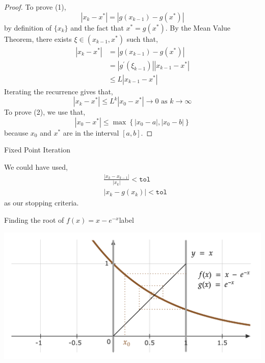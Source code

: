 \begin{proof}
    To prove (1),
    \[\left|x_k-x^*\right|=\left|g\left(x_{k-1}\right)-g\left(x^*\right)\right|\]
    by definition of $\{x_k\}$ and the fact that $x^* = g(x^*)$. By the Mean Value Theorem, there exists $\xi \in (x_{k-1}, x^*)$ such that,
    \begin{align*}
\left|x_k-x^*\right| &=\left|g\left(x_{k-1}\right)-g\left(x^*\right)\right| \\
&=\left|g^{\prime}\left(\xi_{k-1}\right)\right|\left|x_{k-1}-x^*\right| \\
&\leq L|x_{k-1} - x^*|
\end{align*}
Iterating the recurrence gives that,
\[|x_k - x^*| \leq L^k\left|x_0-x^*\right| \rightarrow 0 \text { as } k \rightarrow \infty\]
To prove (2), we use that,
\[|x_0 - x^*| \leq \max \left\{\left|x_0-a\right|,\left|x_0-b\right|\right\}\]
because $x_0$ and $x^*$ are in the interval $[a,b]$.
\end{proof}

\begin{algorithm}
	  \caption{Fixed Point Iteration}\label{fpi}
\end{algorithm}

\begin{marginfigure}
We could have used,
\begin{align*}
&\frac{\left|x_k-x_{k-1}\right|}{\left|x_k\right|}< \texttt{tol} \\
&\left|x_k-g\left(x_k\right)\right|<\texttt{tol}
\end{align*}
as our stopping criteria.
\end{marginfigure}

\begin{ex}{Finding the root of $f(x) = x - e^{-x}$}{label}
    \begin{center}
       \includegraphics[width=\textwidth]{figures/fig-8.png}
\end{center}
\end{ex}

